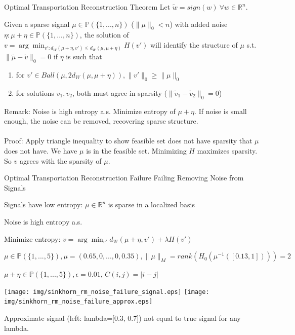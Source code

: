 \documentclass[10pt]{beamer}
\newcommand{\R}{{\mathbb{R}}}
\newcommand{\PP}{{\mathbb{P}}}
\newcommand{\1}{{\mathbbm{1}}}
\begin{document}
\begin{frame}{Optimal Transportation Reconstruction Theorem}
    Let $\tilde w = sign(w) \ \forall w\in\R^n$. \pause
    \begin{theorem}
    Given a sparse signal $\mu\in\PP(\{1,...,n\})$ ($\|\mu\|_0<n$) with added noise $\eta : \mu + \eta \in \PP(\{1,...,n\})$, \pause the solution of $ v=\arg\min_{v' : d_W(\mu+\eta,v') \le d_W(\mu,\mu+\eta)} H(v')$ will identify the structure of $\mu$ s.t. $\|\tilde\mu - \tilde v\|_0=0$ if $\eta$ is such that  \pause
    \begin{enumerate}
        \item for $v' \in Ball(\mu,2d_W(\mu,\mu+\eta)), \|v'\|_0 \ge \|\mu\|_0$ \pause 
        \item for solutions $v_1, v_2$, both must agree in sparsity ($\|\tilde v_1 - \tilde v_2\|_0=0$) \pause
    \end{enumerate}
    \end{theorem}

Remark: Noise is high entropy a.s.  \pause Minimize entropy of $\mu+\eta$. \pause If noise is small enough, the noise can be removed, recovering sparse structure. \\ ~\\

Proof: \pause Apply triangle inequality to show feasible set does not have sparsity that $\mu$ does not have. \pause We have $\mu$ is in the feasible set. \pause Minimizing $H$ maximizes sparsity. So $v$ agrees with the sparsity of $\mu$.

\end{frame}

\begin{frame}{Optimal Transportation Reconstruction Failure}
 \pause
Failing Removing Noise from Signals \pause

Signals have low entropy: $\mu\in\R^n$ is sparse in a localized basis \pause

Noise is high entropy a.s.  \pause

Minimize entropy: $ v=\arg\min_{v'} d_W(\mu+\eta,v') + \lambda H(v')$ \pause

$ \mu \in\PP(\{1,...,5\}), \mu = (0.65,0,...,0,0.35), \|\mu\|_M = rank(H_0(\mu^{-1}([0.13,1]))) = 2$ \pause

$ \mu+\eta \in\PP(\{1,...,5\}), \epsilon=0.01$, $C(i,j)=|i-j|$ \pause

\begin{center}
    
\texttt{[image: img/sinkhorn\_rm\_noise\_failure\_signal.eps]} \pause
\texttt{[image: img/sinkhorn\_rm\_noise\_failure\_approx.eps]} \pause

Approximate signal (left: lambda=[0.3, 0.7]) not equal to true signal for any lambda. 

\end{center}

\end{frame}
\end{document}
